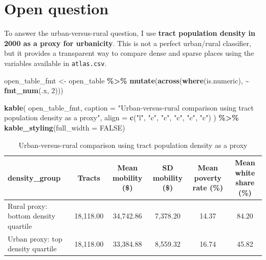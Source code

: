 \documentclass[
]{article}
\newenvironment{Shaded}{\begin{snugshade}}{\end{snugshade}}
\newcommand{\AttributeTok}[1]{\textcolor[rgb]{0.13,0.29,0.53}{#1}}
\newcommand{\ConstantTok}[1]{\textcolor[rgb]{0.56,0.35,0.01}{#1}}
\newcommand{\DecValTok}[1]{\textcolor[rgb]{0.00,0.00,0.81}{#1}}
\newcommand{\FunctionTok}[1]{\textcolor[rgb]{0.13,0.29,0.53}{\textbf{#1}}}
\newcommand{\NormalTok}[1]{#1}
\newcommand{\OtherTok}[1]{\textcolor[rgb]{0.56,0.35,0.01}{#1}}
\newcommand{\SpecialCharTok}[1]{\textcolor[rgb]{0.81,0.36,0.00}{\textbf{#1}}}
\newcommand{\StringTok}[1]{\textcolor[rgb]{0.31,0.60,0.02}{#1}}
\begin{document}
\section{Open question}\label{open-question}

To answer the urban-versus-rural question, I use \textbf{tract
population density in 2000 as a proxy for urbanicity}. This is not a
perfect urban/rural classifier, but it provides a transparent way to
compare dense and sparse places using the variables available in
\texttt{atlas.csv}.

\begin{Shaded}
\begin{Highlighting}[]
\NormalTok{open\_table\_fmt }\OtherTok{\textless{}{-}}\NormalTok{ open\_table }\SpecialCharTok{\%\textgreater{}\%}
  \FunctionTok{mutate}\NormalTok{(}\FunctionTok{across}\NormalTok{(}\FunctionTok{where}\NormalTok{(is.numeric), }\SpecialCharTok{\textasciitilde{}} \FunctionTok{fmt\_num}\NormalTok{(.x, }\DecValTok{2}\NormalTok{)))}

\FunctionTok{kable}\NormalTok{(}
\NormalTok{  open\_table\_fmt,}
  \AttributeTok{caption =} \StringTok{"Urban{-}versus{-}rural comparison using tract population density as a proxy"}\NormalTok{,}
  \AttributeTok{align =} \FunctionTok{c}\NormalTok{(}\StringTok{"l"}\NormalTok{, }\StringTok{"c"}\NormalTok{, }\StringTok{"c"}\NormalTok{, }\StringTok{"c"}\NormalTok{, }\StringTok{"c"}\NormalTok{, }\StringTok{"c"}\NormalTok{)}
\NormalTok{) }\SpecialCharTok{\%\textgreater{}\%}
  \FunctionTok{kable\_styling}\NormalTok{(}\AttributeTok{full\_width =} \ConstantTok{FALSE}\NormalTok{)}
\end{Highlighting}
\end{Shaded}

\begin{longtable}[t]{lccccc}
\caption{\label{tab:open-table}Urban-versus-rural comparison using tract population density as a proxy}\\
\toprule
density\_group & Tracts & Mean mobility (\$) & SD mobility (\$) & Mean poverty rate (\%) & Mean white share (\%)\\
\midrule
Rural proxy: bottom density quartile & 18,118.00 & 34,742.86 & 7,378.20 & 14.37 & 84.20\\
Urban proxy: top density quartile & 18,118.00 & 33,384.88 & 8,559.32 & 16.74 & 45.82\\
\bottomrule
\end{longtable}
\end{document}
